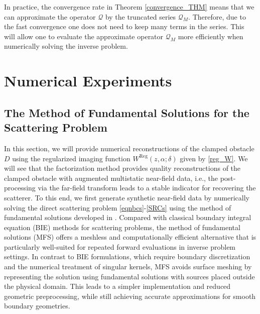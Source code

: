 \documentclass{article}
\begin{document}
In practice, the convergence rate in Theorem \ref{convergence_THM} means that we can approximate the operator $\mathcal{Q}$ by the truncated series $\mathcal{Q}_M$. Therefore, due to the fast convergence one does not need to keep many terms in the series. This will allow one to evaluate the approximate operator $\mathcal{Q}_M$ more efficiently when numerically solving the inverse problem.
\section{Numerical Experiments}\label{numerics_sect}
\subsection{The Method of Fundamental Solutions for the Scattering Problem}
In this section, we will provide numerical reconstructions of the clamped obstacle $D$ using the regularized imaging function $W^{\mathrm{Reg}}(z,\alpha;\delta)$ given by \eqref{reg_W}. We will see that the factorization method provides quality reconstructions of the clamped obstacle with augmented multistatic near-field data, i.e., the post-processing via the far-field transform leads to a stable indicator for recovering the scatterer. To this end, we first generate synthetic near-field data by numerically solving the direct scattering problem \eqref{eqnbcs}-\eqref{SRCs} using the method of fundamental solutions developed in \cite{karageorghislesnic2024}. Compared with classical boundary integral equation (BIE) methods for scattering problems, the method of fundamental solutions (MFS) offers a meshless and computationally efficient alternative that is particularly well-suited for repeated forward evaluations in inverse problem settings. In contrast to BIE formulations, which require boundary discretization and the numerical treatment of singular kernels, MFS avoids surface meshing by representing the solution using fundamental solutions with sources placed outside the physical domain. This leads to a simpler implementation and reduced geometric preprocessing, while still achieving accurate approximations for smooth boundary geometries.  
\end{document}
